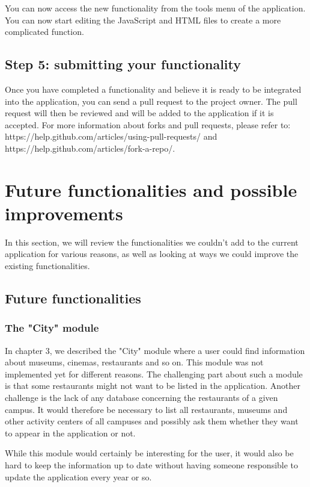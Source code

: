 \documentclass[11pt, a4paper]{report}
\begin{document}
You can now access the new functionality from the tools menu of the application. You can now start editing the JavaScript and HTML files to create a more complicated function.

\subsection{Step 5: submitting your functionality}

Once you have completed a functionality and believe it is ready to be integrated into the application, you can send a pull request to the project owner. The pull request will then be reviewed and will be added to the application if it is accepted. For more information about forks and pull requests, please refer to: https://help.github.com/articles/using-pull-requests/ and https://help.github.com/articles/fork-a-repo/.

\section{Future functionalities and possible improvements}

In this section, we will review the functionalities we couldn't add to the current application for various reasons, as well as looking at ways we could improve the existing functionalities.

\subsection{Future functionalities}

\subsubsection{The "City" module}

In chapter 3, we described the "City" module where a user could find information about museums, cinemas, restaurants and so on. This module was not implemented yet for different reasons. The challenging part about such a module is that some restaurants might not want to be listed in the application. Another challenge is the lack of any database concerning the restaurants of a given campus. It would therefore be necessary to list all restaurants, museums and other activity centers of all campuses and possibly ask them whether they want to appear in the application or not.

While this module would certainly be interesting for the user, it would also be hard to keep the information up to date without having someone responsible to update the application every year or so.
\end{document}

